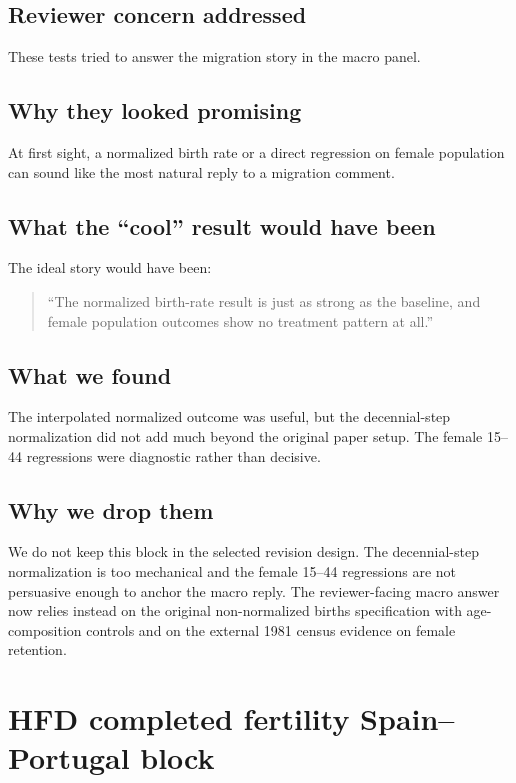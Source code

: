 \documentclass[11pt]{article}
\begin{document}
\subsection*{Reviewer concern addressed}

These tests tried to answer the migration story in the macro panel.

\subsection*{Why they looked promising}

At first sight, a normalized birth rate or a direct regression on female population can sound like the most natural reply to a migration comment.

\subsection*{What the ``cool'' result would have been}

The ideal story would have been:
\begin{quote}
``The normalized birth-rate result is just as strong as the baseline, and female population outcomes show no treatment pattern at all.''
\end{quote}

\subsection*{What we found}

The interpolated normalized outcome was useful, but the decennial-step normalization did not add much beyond the original paper setup. The female 15--44 regressions were diagnostic rather than decisive.

\subsection*{Why we drop them}

We do not keep this block in the selected revision design. The decennial-step normalization is too mechanical and the female 15--44 regressions are not persuasive enough to anchor the macro reply. The reviewer-facing macro answer now relies instead on the original non-normalized births specification with age-composition controls and on the external 1981 census evidence on female retention.

\section{HFD completed fertility Spain--Portugal block}
\end{document}
